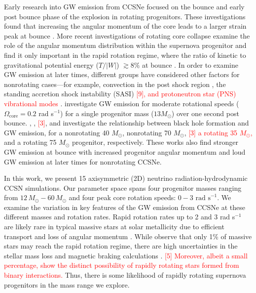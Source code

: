 \documentclass[twocolumn,times]{aastex62}  %
\begin{document}
Early research into GW emission from CCSNe focused on the bounce and early post bounce phase of the explosion in rotating progenitors.
These investigations found that increasing the angular momentum of the core leads to a larger strain peak at bounce \citep{muller:1982,moench:1991,yamada:1995,zwerger:1997,dimm:2002,kotake:2003,shibata:2004}.  
More recent investigations of rotating core collapse examine the role of the angular momentum distribution within the supernova progenitor and find it only important in the rapid rotation regime, where the ratio of kinetic to gravitational potential energy ($T/|W|$) $ \gtrsim 8\%$ at bounce \citep{abdik:2014}. In order to examine GW emission at later times, different groups have considered other factors for nonrotating cases---for example, convection in the post shock region \citep{burrows:1996,muller:1997,muller:2004,murphy:2009,marek:2009b}, the standing accretion shock instability (SASI) \citep{blondin:2003,blondin:2006,ohnishi:2006,foglizzo:2007,scheck:2008,iwakami:2009,fernandez:2010}\textcolor{red}{[9], and protoneutron star (PNS) vibrational modes \citep{cerda-duran:2013,torres-forne:2018,torres-forne:2019}}.  \citet{moro:2018} investigate GW emission for moderate rotational speeds ($\Omega_{\mathrm{core}} = 0.2$ rad s$^{-1}$) for a single progenitor mass ($13 M_\odot$) over one second post bounce.  \citet{pan:2018}, \citet{kuroda:2018}, \textcolor{red}{[3]}\citet{cerda-duran:2013}, and \citet{ott:2011} investigate the relationship between black hole formation and GW emission, for a nonrotating 40 $M_\odot$, nonrotating  70 $M_\odot$, \textcolor{red}{[3] a rotating 35 $M_\odot$,} and a rotating 75 $M_\odot$ progenitor, respectively.  These works also find stronger GW emission at bounce with increased progenitor angular momentum and loud GW emission at later times for nonrotating CCSNe.
 

In this work, we present 15 axisymmetric (2D) neutrino radiation-hydrodynamic CCSN simulations.  
Our parameter space spans four progenitor masses ranging from $12\,M_\odot-60\,M_\odot$ \citep{Suk:2016} and four peak core rotation speeds: $0-3 \text{ rad s}^{-1}$.  
We examine the variation in key features of the GW emission from CCSNe at these different masses and rotation rates.
Rapid rotation rates up to 2 and 3 rad s$^{-1}$ are likely rare in typical massive stars at solar metallicity due to efficient transport and loss of angular momentum \citep{heger:2005}.
While \citet{woosley:2006} observe that only 1\% of massive stars may reach the rapid rotation regime, there are high uncertainties in the stellar mass loss and magnetic braking calculations \citep{smith:2014}.  \textcolor{red}{[5] Moreover, albeit a small percentage, \citet{demink:2013} show the distinct possibility of rapidly rotating stars formed from binary interactions.} Thus, there is some likelihood of rapidly rotating supernova progenitors in the mass range we explore.  
\end{document}
